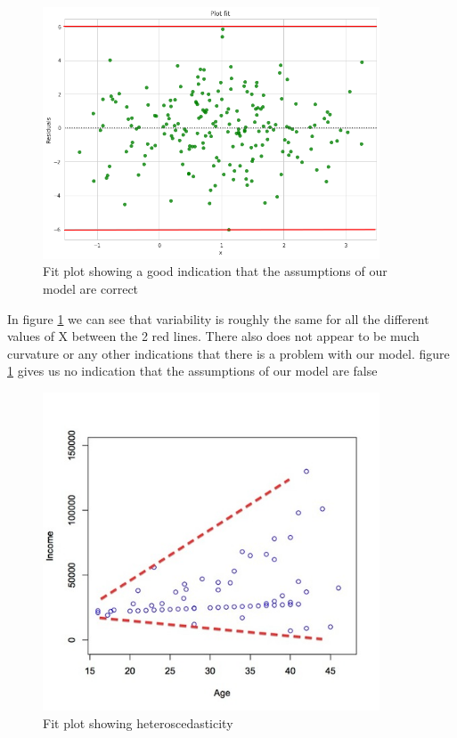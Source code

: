 \begin{figure}[H]
  \centering
  \includegraphics[scale=0.5,width=100mm]{./images/plotfit-good.png}
  \caption{Fit plot showing a good indication that the assumptions of our model are correct}
  \label{fig:fitsplotgood}
\end{figure}

In figure \ref{fig:fitsplotgood} we can see that variability is roughly the same for all the different values of X between the 2 red lines. There also does not appear to be much curvature or any other indications that there is a problem with our model. figure \ref{fig:fitsplotgood} gives us no indication that the assumptions of our model are false

\begin{figure}[H]
  \centering
  \includegraphics[scale=0.5,width=100mm]{./images/heteroscedasticity.jpg}
  \caption{Fit plot showing heteroscedasticity}
  \label{fig:fitsplotbad}
\end{figure}

